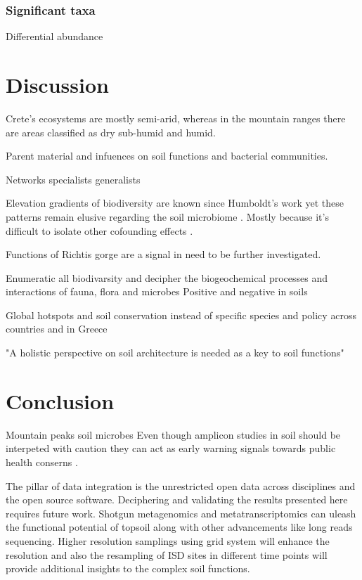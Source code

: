 \documentclass[unnumsec,webpdf,contemporary,large]{oup-authoring-template}%
\theoremstyle{thmstyleone}%
\theoremstyle{thmstyletwo}%
\theoremstyle{thmstylethree}%
\begin{document}
\subsubsection{Significant taxa}\label{sig_taxa}

Differential abundance

\section{Discussion}\label{discussion}

Crete's ecosystems are mostly semi-arid, whereas in the mountain ranges there 
are areas classified as dry sub-humid and humid. 

Parent material and infuences on soil functions and bacterial communities.

Networks specialists generalists \cite{Barberan2012}

Elevation gradients of biodiversity are known since Humboldt's work \cite{Rahbek2019} 
yet these patterns remain elusive regarding the soil microbiome \cite{Looby2020, Siles2023}.
Mostly because it's difficult to isolate other cofounding effects \cite{Nottingham2018}. 

Functions of Richtis gorge are a signal in need to be further investigated.

Enumeratic all biodivarsity \cite{Anthony2023} and decipher the biogeochemical 
processes and interactions of fauna, flora and microbes \cite{Fry2019, Crowther2019,GRANDY201640,Delgado-Baquerizo2020}
Positive and negative in soils \cite{Liu2024}

Global hotspots \cite{Guerra2022}
and soil conservation instead of specific species \cite{Guerra2021}
and policy \cite{KONINGER2022} across countries \cite{Putten2023} and in Greece \cite{SCHISMENOS2022100035}

"A holistic perspective on soil architecture is needed as a key to soil functions" \cite{philippot2024the-interplay}
\section{Conclusion}

Mountain peaks soil microbes \cite{Adamczyk2019}
Even though amplicon studies in soil should be interpeted with caution \cite{alteio2021} they 
can act as early warning signals towards public health conserns \cite{Banerjee2023}.

The pillar of data integration is the unrestricted open data across disciplines and 
the open source software.
Deciphering and validating the results presented here requires future work.
Shotgun metagenomics and metatranscriptomics can uleash the functional potential of
topsoil along with other advancements like long reads sequencing. Higher resolution
samplings using grid system will enhance the resolution and also the resampling of
ISD sites in different time points will provide additional insights to the complex soil 
functions.
\end{document}
